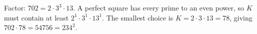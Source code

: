 Factor: $702=2\cdot3^3\cdot13$. A perfect square has every prime to an even power, so $K$ must contain at least $2^1\cdot3^1\cdot13^1$. The smallest choice is $K=2\cdot3\cdot13=\boxed{78}$, giving $702\cdot78=54756=234^2$.
